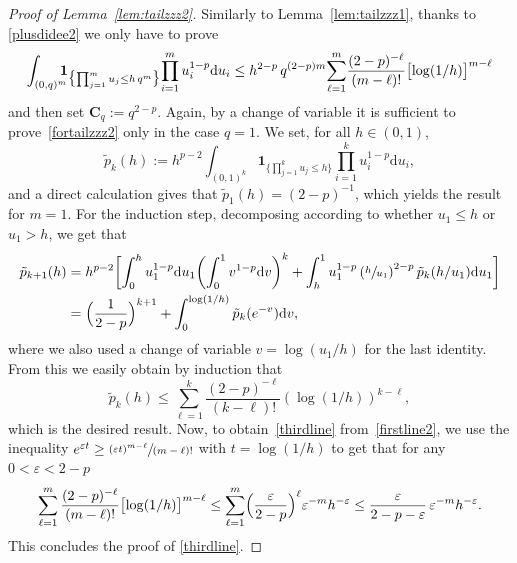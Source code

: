 \documentclass[10pt]{amsart}
\theoremstyle{definition}
\newcommand{\dd}{\mathrm{d}}
\newcommand{\ind}{\mathbf{1}}
\newcommand{\bC}{{\ensuremath{\mathbf C}} }
\let\gep\varepsilon
\begin{document}
\begin{proof}[Proof of Lemma~\ref{lem:tailzzz2}]
Similarly to Lemma~\ref{lem:tailzzz1},
thanks to \eqref{plusdidee2} we only have to prove
\begin{equation}
\label{fortailzzz2}
\int_{(0,q)^m}\hspace*{-2.5mm} \ind_{\bigl\{\prod^m_{j=1}u_j \le h\, q^m\bigr\}}\! \prod_{i=1}^m u^{1-p}_i \dd u_i \le h^{2-p} \, q^{(2-p)m}\!\sum_{\ell=1}^{m}\!\frac{(2-p)^{-\ell}}{(m-\ell)!} \bigl[\log (1/h)\bigr]^{m-\ell}
\end{equation}
and then set $\bC_q := q^{2-p}$.
Again, by a change of variable it is sufficient to prove~\eqref{fortailzzz2} only in the case $q=1$.
We set, for all $h\in (0,1)$,
\begin{equation*}
\tilde p_k(h):= h^{p-2}\int_{(0,1)^k}
\ind_{\bigl\{\prod^k_{j=1}u_j \le h\bigr\}} \prod_{i=1}^k u^{1-p}_i \dd u_i,
\end{equation*}
and a direct calculation gives that $\tilde p_1(h)=(2-p)^{-1}$,
which yields the result for $m=1$.
For the induction step, decomposing according to whether $u_1 \leq h$ or $u_1>h$, we get that
\begin{align*}
\tilde p_{k+1}(h) &= h^{p-2} \biggl[ \int^{h}_0 u_1^{1-p}\dd u_1 \biggl(\int_{0}^1 v^{1-p}\dd v\biggr)^k + \int^1_{h} u_1^{1-p}\left(\sfrac{h}{u_1} \right)^{2-p} \tilde p_k(h/u_1) \dd u_1 \biggr] \\
& = \Bigl(\frac{1}{2-p}\Bigr)^{k+1}+ \int_0^{\log(1/h)} \tilde p_k(e^{-v}) \dd v,
\end{align*}
where we also used a change of variable $v=\log(u_1/h)$ for the last identity.
From this we easily obtain by induction
that
\begin{equation*}
\tilde p_k(h) \le \sum_{\ell=1}^{k} \frac{(2-p)^{-\ell}}{(k-\ell)!} (\log (1/h))^{k-\ell},
\end{equation*}
which is the desired result.
Now, to obtain~\eqref{thirdline} from~\eqref{firstline2}, we use the inequality $e^{\gep t} \geq \sfrac{(\gep t)^{m-\ell}}{(m-\ell)!}$ with $t=\log (1/h)$ to get that for any $0<\gep<2-p$
\begin{equation}
\sum_{\ell=1}^{m}\frac{(2-p)^{-\ell}}{(m-\ell)!} \bigl[\log (1/h)\bigr]^{m-\ell} \le \sum_{\ell=1}^{ m} \Bigl(\frac{\gep}{2-p}\Bigr)^{\ell} \gep^{ -m} h^{-\gep} \le \frac{\gep}{ 2-p-\gep}\, \gep^{ -m} h^{-\gep}.
\end{equation}
This concludes the proof of \eqref{thirdline}.
\end{proof}
\end{document}
